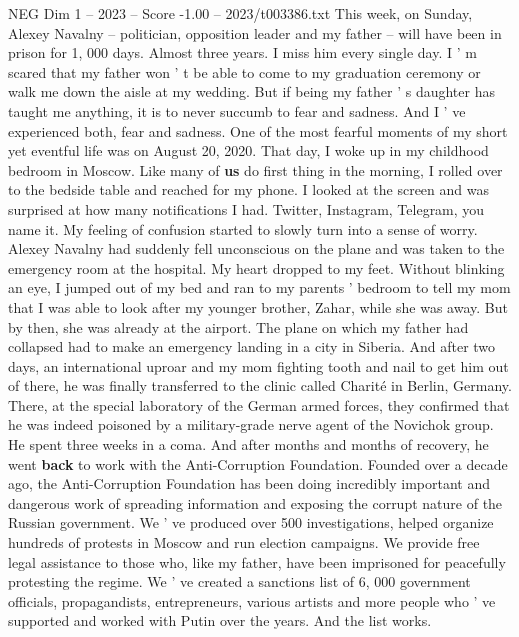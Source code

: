 \begin{textsample}{NEG Dim 1 – 2023 – Score -1.00 – 2023/t003386.txt}  \label{ex:f1_neg_018}
This week, on Sunday, Alexey Navalny -- politician, opposition leader and my father -- will have been in prison for 1, 000 days.
Almost three years.
I miss him every single day.
I ' m scared that my father won ' t be able to come to my graduation ceremony or walk me down the aisle at my wedding.
But if being my father ' s daughter has taught me anything, it is to never succumb to fear and sadness.
And I ' ve experienced both, fear and sadness.
One of the most fearful moments of my short yet eventful life was on August 20, 2020.
That day, I woke up in my childhood bedroom in Moscow.
Like many of \textbf{us} do first thing in the morning, I rolled over to the bedside table and reached for my phone.
I looked at the screen and was surprised at how many notifications I had.
Twitter, Instagram, Telegram, you name it.
My feeling of confusion started to slowly turn into a sense of worry.
Alexey Navalny had suddenly fell unconscious on the plane and was taken to the emergency room at the hospital.
My heart dropped to my feet.
Without blinking an eye, I jumped out of my bed and ran to my parents ' bedroom to tell my mom that I was able to look after my younger brother, Zahar, while she was away.
But by then, she was already at the airport.
The plane on which my father had collapsed had to make an emergency landing in a city in Siberia.
And after two days, an international uproar and my mom fighting tooth and nail to get him out of there, he was finally transferred to the clinic called Charité in Berlin, Germany.
There, at the special laboratory of the German armed forces, they confirmed that he was indeed poisoned by a military-grade nerve agent of the Novichok group.
He spent three weeks in a coma.
And after months and months of recovery, he went \textbf{back} to work with the Anti-Corruption Foundation.
Founded over a decade ago, the Anti-Corruption Foundation has been doing incredibly important and dangerous work of spreading information and exposing the corrupt nature of the Russian government.
We ' ve produced over 500 investigations, helped organize hundreds of protests in Moscow and run election campaigns.
We provide free legal assistance to those who, like my father, have been imprisoned for peacefully protesting the regime.
We ' ve created a sanctions list of 6, 000 government officials, propagandists, entrepreneurs, various artists and more people who ' ve supported and worked with Putin over the years.
And the list works.

\end{textsample}
